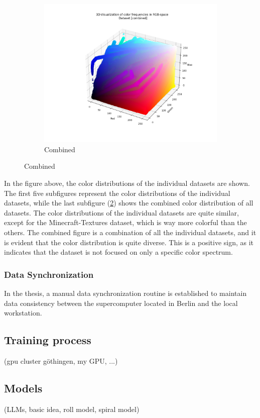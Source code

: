 \begin{figure}[htbp]
\begin{subfigure}{.33\textwidth}
        \end{subfigure}%
        \hfill
        \begin{subfigure}{.33\textwidth}
            \centering
            \includegraphics[width=\linewidth]{../code/dataAnalysis/output/combined.png}
            \caption{Combined}
            \label{fig:dataset-Combined}
        \end{subfigure}%
        \hfill
    \end{figure}

    In the figure above, the color distributions of the individual datasets are shown. The first five subfigures represent the color distributions of the individual datasets, while the last subfigure (\ref{fig:dataset-Combined}) shows the combined color distribution of all datasets. The color distributions of the individual datasets are quite similar, except for the Minecraft-Textures dataset, which is way more colorful than the others. The combined figure is a combination of all the individual datasets, and it is evident that the color distribution is quite diverse. This is a positive sign, as it indicates that the dataset is not focused on only a specific color spectrum.

    \subsubsection{Data Synchronization}

    In the thesis, a manual data synchronization routine is established to maintain data consistency between the supercomputer located in Berlin and the local workstation.

\subsection{Training process}
    (gpu cluster göthingen, my GPU, ...)

\subsection{Models}
    (LLMs, basic idea, roll model, spiral model)